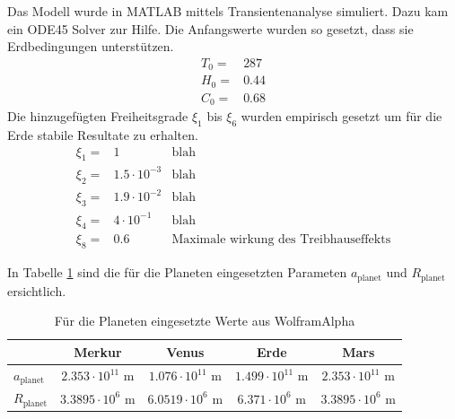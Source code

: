 \begin{refsection}
Das Modell wurde in MATLAB mittels Transientenanalyse simuliert. Dazu kam ein ODE45 Solver zur Hilfe. Die Anfangswerte wurden so gesetzt, dass sie Erdbedingungen unterstützen.  
\begin{equation}
\begin{matrix}
T_0 = & 287 \\
H_0 = & 0.44 \\
C_0 = & 0.68
\end{matrix}
\end{equation}
Die hinzugefügten Freiheitsgrade $\xi_1$ bis $\xi_6$ wurden empirisch gesetzt um für die Erde stabile Resultate zu erhalten.
\begin{equation}
\begin{matrix}
\xi_1 = & 1                 & \text{blah} \\
\xi_2 = & 1.5 \cdot 10^{-3} & \text{blah} \\
\xi_3 = & 1.9 \cdot 10^{-2} & \text{blah} \\
\xi_4 = & 4   \cdot 10^{-1} & \text{blah} \\
\xi_8 = & 0.6				& \text{Maximale wirkung des Treibhauseffekts}
\end{matrix}
\end{equation}

In Tabelle \ref{planeten:planetValues} sind die für die Planeten eingesetzten Parameten $a_{\text{planet}}$ und $R_{\text{planet}}$ ersichtlich.
\begin{center}
\begin{table}[!h]
	\center
	\begin{tabular}{l|c c c c}
                        & Merkur                    & Venus                    & Erde                    & Mars     \\
  \hline
  $a_{\text{planet}}$   & $2.353 \cdot 10^{11}$ m   & $1.076 \cdot 10^{11}$ m  & $1.499 \cdot 10^{11}$ m & $2.353 \cdot 10^{11}$ m \\
  $R_{\text{planet}}$   & $3.3895 \cdot 10^{6}$ m   & $6.0519 \cdot 10^{6}$ m  & $6.371 \cdot 10^{6}$ m  & $3.3895 \cdot 10^{6}$ m 
\end{tabular}
\caption{Für die Planeten eingesetzte Werte aus WolframAlpha}
\label{planeten:planetValues}
\end{table}
\end{center}






\end{refsection}
